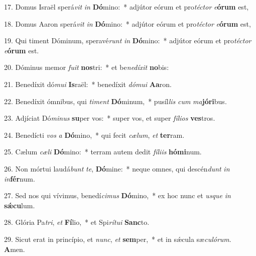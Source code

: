 17. Domus Israël sperá\textit{vit} \textit{in} \textbf{Dó}mino:~*  adjútor eórum et pro\textit{téc}\textit{tor} \textit{e}\textbf{ó}\textbf{rum} est,\

18. Domus Aaron sperá\textit{vit} \textit{in} \textbf{Dó}mino:~*  adjútor eórum et pro\textit{téc}\textit{tor} \textit{e}\textbf{ó}\textbf{rum} est,\

19. Qui timent Dóminum, speravé\textit{runt} \textit{in} \textbf{Dó}mino:~*  adjútor eórum et pro\textit{téc}\textit{tor} \textit{e}\textbf{ó}\textbf{rum} est.\

20. Dóminus memor \textit{fu}\textit{it} \textbf{nos}tri:~*  et be\textit{ne}\textit{dí}\textit{xit} \textbf{no}bis:\

21. Benedíxit dó\textit{mu}\textit{i} \textbf{Is}raël:~*  benedíxit \textit{dó}\textit{mu}\textit{i} \textbf{A}\textbf{a}ron.\

22. Benedíxit ómnibus, qui \textit{ti}\textit{ment} \textbf{Dó}minum,~*  pusíl\textit{lis} \textit{cum} \textit{ma}\textbf{jó}\textbf{ri}bus.\

23. Adjíciat Dó\textit{mi}\textit{nus} \textbf{su}per vos:~*  super vos, et super \textit{fí}\textit{li}\textit{os} \textbf{ves}tros.\

24. Benedícti \textit{vos} \textit{a} \textbf{Dó}mino,~*  qui fecit \textit{cæ}\textit{lum}, \textit{et} \textbf{ter}ram.\

25. Cælum \textit{cæ}\textit{li} \textbf{Dó}mino:~*  terram autem dedit \textit{fí}\textit{li}\textit{is} \textbf{hó}\textbf{mi}num.\

26. Non mórtui laudá\textit{bunt} \textit{te}, \textbf{Dó}mine:~*  neque omnes, qui descén\textit{dunt} \textit{in} \textit{in}\textbf{fér}num.\

27. Sed nos qui vívimus, benedí\textit{ci}\textit{mus} \textbf{Dó}mino,~*  ex hoc nunc et \textit{us}\textit{que} \textit{in} \textbf{sǽ}\textbf{cu}lum.\

28. Glória Pa\textit{tri}, \textit{et} \textbf{Fí}lio,~*  et Spi\textit{rí}\textit{tu}\textit{i} \textbf{Sanc}to.\

29. Sicut erat in princípio, et \textit{nunc}, \textit{et} \textbf{sem}per,~*  et in sǽcula sæ\textit{cu}\textit{ló}\textit{rum}. \textbf{A}men.\

